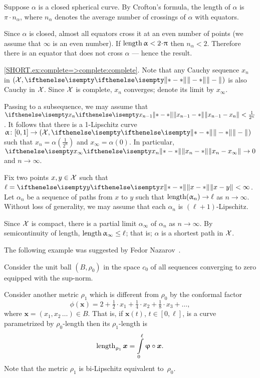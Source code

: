 Suppose $\alpha$ is a closed spherical curve. 
By Crofton's formula, the length of  $\alpha$  is $\pi\cdot n_\alpha$, where $n_\alpha$ denotes the average number of crossings of $\alpha$ with equators.

Since $\alpha$ is closed, almost all equators cross it at an even number of points (we assume that $\infty$ is an even number).
If $\length \alpha<2\cdot\pi$ then $n_\alpha<2$.
Therefore there is an equator that does not cross $\alpha$ --- hence the result.


\parbf{\ref{ex:complete=>complete};} \ref{SHORT.ex:complete=>complete:complete}.
Note that any Cauchy sequence $x_n$ in $(\spc{X},\yetdist{}{}{})$ is also Cauchy in $\mathcal{X}$.
Since $\mathcal{X}$ is complete, $x_n$ converges; denote its limit by $x_\infty$.

Passing to a subsequence, we may assume that $\yetdist{x_{n-1}}{x_n}{}<\tfrac1{2^n}$.
It follows that there is a 1-Lipschitz curve $\alpha\:[0,1]\to (\spc{X},\yetdist{}{}{})$ such that $x_n=\alpha(\tfrac1{2^n})$ and $x_\infty=\alpha(0)$.
In particular, $\yetdist{x_n}{x_\infty}{}\to0$ and $n\to\infty$.

Fix two points $x,y\in\spc{X}$ such that $\ell=\yetdist{x}{y}{}<\infty$.
Let $\alpha_n$ be a sequence of paths from $x$ to $y$ such that $\length(\alpha_n)\to\ell$ as $n\to \infty$.
Without loss of generality, we may assume that each $\alpha_n$ is $(\ell+1)$-Lipschitz.

Since $\mathcal{X}$ is compact, there is a partial limit $\alpha_\infty$ of $\alpha_n$ as $n\to \infty$.
By semicontinuity of length, $\length\alpha_\infty\le\ell$;
that is; $\alpha$ is a shortest path in $\mathcal{X}$.

The following example was suggested by Fedor Nazarov~\cite{nazarov}.

\medskip

Consider the unit ball $(B,\rho_0)$
in the space $c_0$ of all sequences converging to zero equipped with the sup-norm.

Consider another metric $\rho_1$ which is different from $\rho_0$ by the conformal factor
\[\phi(\bm{x})=2+\tfrac{1}2\cdot x_1+\tfrac{1}4\cdot x_2+\tfrac{1}8\cdot x_3+\dots,\]
where $\bm{x}=(x_1,x_2\,\dots)\in B$.
That is, if $\bm{x}(t)$, $t\in[0,\ell]$, is a curve parametrized by $\rho_0$-length 
then its $\rho_1$-length is 
\[\length_{\rho_1}\bm{x}=\int\limits_0^\ell\phi\circ\bm{x}.\]
Note that the metric $\rho_1$ is bi-Lipschitz equivalent  to~$\rho_0$.


